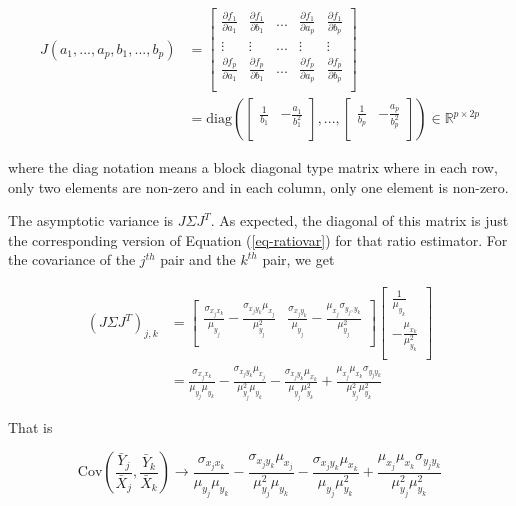 \documentclass{article}
\newcommand{\Cov}{\mbox{Cov}}
\theoremstyle{definition}
\begin{document}
\begin{align*} 
J(a_1,...,a_p,b_1,...,b_p) &= \begin{bmatrix}
\frac{\partial f_1 }{\partial a_1} & \frac{\partial f_1 }{\partial b_1} & ... &  \frac{\partial f_1 }{\partial a_p}&  \frac{\partial f_1 }{\partial b_p}\\
\vdots  & \vdots &  ... & \vdots & \vdots  \\
\frac{\partial f_p }{\partial a_1} & \frac{\partial f_p }{\partial b_1} & ... &  \frac{\partial f_p }{\partial a_p}   & \frac{\partial f_p }{\partial b_p}\\
\end{bmatrix} \\ 
&= \text{diag}\left(\begin{bmatrix}
\frac{1}{b_1} & -\frac{a_1}{b_1^2} \\ 
\end{bmatrix},...,\begin{bmatrix}
\frac{1}{b_p} & -\frac{a_p}{b_p^2} \\ 
\end{bmatrix} \right) \in \mathbb{R}^{p\times 2p}
\end{align*}  

where the diag notation means a block diagonal type matrix where in each row, only two elements are non-zero and in each column, only one element is non-zero. 

The asymptotic variance is $J\Sigma J^T$. As expected, the diagonal of this matrix is just the corresponding version of Equation (\ref{eq-ratiovar}) for that ratio estimator. For the covariance of the $j^{th}$ pair and the $k^{th}$ pair, we get

\begin{align*}
(J\Sigma J^T)_{j,k} &= 
    \begin{bmatrix}
  \frac{\sigma_{x_jx_k}}{\mu_{y_j}} - \frac{\sigma_{x_jy_k}\mu_{x_j}}{\mu_{y_j}^2}  & \frac{\sigma_{x_jy_k}}{\mu_{y_j}} - \frac{\mu_{x_j}\sigma_{y_j,y_k}}{\mu_{y_j}^2} \\
\end{bmatrix} \begin{bmatrix}
   \frac{1}{\mu_{y_k}} \\ 
    -\frac{\mu_{x_k}}{\mu_{y_k}^2} \\ 
\end{bmatrix}\\ 
&= \frac{\sigma_{x_jx_k}}{\mu_{y_j}\mu_{y_k}} - \frac{\sigma_{x_jy_k}\mu_{x_j}}{\mu^2_{y_j}\mu_{y_k}} - \frac{\sigma_{x_jy_k}\mu_{x_k}}{\mu_{y_j}\mu_{y_k}^2}  + \frac{\mu_{x_j}\mu_{x_k}\sigma_{y_jy_k}}{\mu_{y_j}^2\mu_{y_k}^2}
\end{align*}

That is 

\begin{equation*}
    \Cov\left(\frac{\bar{Y}_j}{\bar{X}_j}, \frac{\bar{Y}_k}{\bar{X}_k}\right) \rightarrow \frac{\sigma_{x_jx_k}}{\mu_{y_j}\mu_{y_k}} - \frac{\sigma_{x_jy_k}\mu_{x_j}}{\mu^2_{y_j}\mu_{y_k}} - \frac{\sigma_{x_jy_k}\mu_{x_k}}{\mu_{y_j}\mu_{y_k}^2}  + \frac{\mu_{x_j}\mu_{x_k}\sigma_{y_jy_k}}{\mu_{y_j}^2\mu_{y_k}^2}
\end{equation*}
\end{document}
